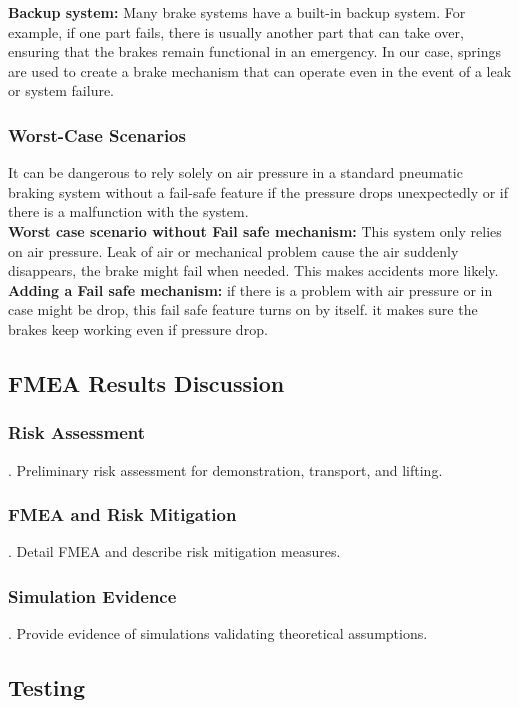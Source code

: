 \noindent
\textbf{Backup system:} Many brake systems have a built-in backup system. For example, if one part fails, there is usually another part that can take over, ensuring that the brakes remain functional in an emergency. In our case, springs are used to create a brake mechanism that can operate even in the event of a leak or system failure. 
\subsubsection{Worst-Case Scenarios}

It can be dangerous to rely solely on air pressure in a standard pneumatic braking system without a fail-safe feature if the pressure drops unexpectedly or if there is a malfunction with the system.  \\

 \noindent
\textbf{Worst case scenario without Fail safe mechanism:}
This system only relies on air pressure. Leak of air or mechanical problem cause the air suddenly disappears, the brake might fail when needed. This makes accidents more likely.\\

\noindent
\textbf{Adding a Fail safe mechanism:}
if there is a problem with air pressure or  in case might be drop, this fail safe feature turns on by itself. it makes sure the brakes keep working even if pressure drop.

\subsection{FMEA Results Discussion}
\subsubsection{Risk Assessment}
.  Preliminary risk assessment for demonstration, transport, and lifting.
\subsubsection{FMEA and Risk Mitigation}
.  Detail FMEA and describe risk mitigation measures.
\subsubsection{Simulation Evidence}
.  Provide evidence of simulations validating theoretical assumptions.


\subsection{Testing}
